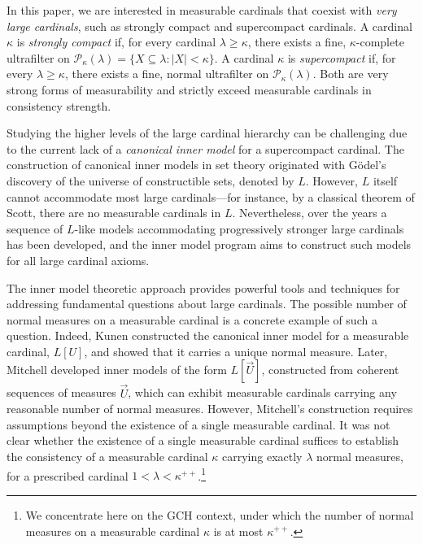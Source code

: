 \documentclass[11pt]{amsart}
\theoremstyle{definition}
\theoremstyle{remark}
\newcommand\<{{<}}
\begin{document}
In this paper, we are interested in measurable cardinals that coexist with \emph{very large cardinals}, such as strongly compact and supercompact cardinals. A cardinal $\kappa$ is \emph{strongly compact} if, for every cardinal $\lambda \geq \kappa$, there exists a fine, $\kappa$-complete ultrafilter on $\mathcal{P}_{\kappa}(\lambda)=\{X\subseteq \lambda : |X|<\kappa\}$. A cardinal $\kappa$ is \emph{supercompact} if, for every $\lambda \geq \kappa$, there exists a fine, normal ultrafilter on $\mathcal{P}_{\kappa}(\lambda)$. Both are very strong forms of measurability and strictly exceed measurable cardinals in consistency strength.
\smallskip

Studying the higher levels of the large cardinal hierarchy can be challenging due to the current lack of a \emph{canonical inner model} for a supercompact cardinal. The construction of canonical inner models in set theory originated with Gödel's discovery of the universe of constructible sets, denoted by $L$. However, $L$ itself cannot accommodate most large cardinals—for instance, by a classical theorem of Scott, there are no measurable cardinals in $L$. Nevertheless, over the years a sequence of $L$-like models accommodating progressively stronger large cardinals has been developed, and the inner model program aims to construct such models for all large cardinal axioms.
\smallskip

The inner model theoretic approach provides powerful tools and techniques for addressing fundamental questions about large cardinals. The possible number of normal measures on a measurable cardinal is a concrete example of such a question. Indeed, Kunen constructed the canonical inner model for a measurable cardinal, $L[U]$, and showed that it carries a unique normal measure. Later, Mitchell developed inner models of the form $L[\vec{U}]$, constructed from coherent sequences of measures $\vec{U}$, which can exhibit measurable cardinals carrying any reasonable number of normal measures. However, Mitchell's construction requires assumptions beyond the existence of a single measurable cardinal. It was not clear whether the existence of a single measurable cardinal suffices to establish the consistency of a measurable cardinal $\kappa$ carrying exactly $\lambda$ normal measures, for a prescribed cardinal $1<\lambda<\kappa^{++}$.\footnote{We concentrate here on the GCH context, under which the number of normal measures on a measurable cardinal $\kappa$ is at most $\kappa^{++}$.}
\smallskip
\end{document}
